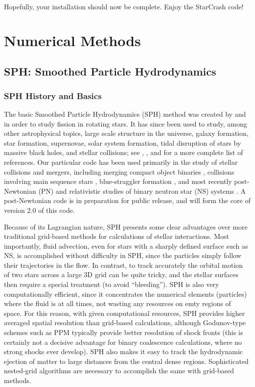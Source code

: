 Hopefully, your installation should now be complete.  Enjoy the StarCrash code!

\newpage
\section{Numerical Methods}
\label {nm}
\subsection{SPH: Smoothed Particle Hydrodynamics}
\label{nm:sph}
\subsubsection{SPH History and Basics}\label{nm:sph:hb}
The basic Smoothed Particle Hydrodynamics (SPH) method was created 
by \citet{Lucy} and \citet{GM} in order 
to study fission in rotating stars.  It has since been used to study,
among other 
astrophysical topics, large scale structure in the universe, 
galaxy formation, star formation, supernovae,
solar system formation, tidal disruption of stars by massive black
holes, and stellar collisions; see \citet{RS1}, \citet{Mon1992}, 
and \citet{Ras1999} for a more complete list of references.  
Our particular code has been used primarily in the study of stellar
collisions and mergers, including merging compact object binaries \citep{RS1,RS2,RS3},
collisions involving main sequence stars
\citep{RS1991,LRS1993,Sills1997,Sills2001}, 
blue-straggler formation \citep{LomRS1995,LOMRS1,Lom2002}, and most
recently post-Newtonian 
(PN) and relativistic 
studies of binary neutron star (NS) systems \citep{FR1,FR2,FR3}.  A post-Newtonian code is in
preparation for public release, and will form the core of version 2.0 of this
code.   

Because of its Lagrangian nature,
SPH presents some clear advantages over more traditional 
grid-based methods for calculations of stellar interactions. Most
importantly, fluid advection, even for stars with a sharply defined surface
such as NS, is accomplished without difficulty in SPH, since the
particles simply follow their trajectories in the flow. In contrast, 
to track accurately the orbital motion of two stars across a large 3D grid
can be quite tricky, and the stellar surfaces then require a special
treatment (to avoid ``bleeding''). SPH is
also very computationally efficient, since it concentrates the
numerical elements (particles) where the fluid is at all times,
not wasting any resources on emty regions of space. For
this reason, with given computational resources, SPH provides higher
averaged spatial resolution than grid-based calculations, although
Godunov-type schemes such as PPM typically provide better 
resolution of shock fronts (this is certainly not a decisive advantage for
binary coalescence calculations, where no strong shocks ever develop).
SPH also makes it easy to track the hydrodynamic ejection of matter to 
large distances from the central dense regions. Sophisticated nested-grid 
algorithms are necessary to accomplish the same with grid-based
methods. 

